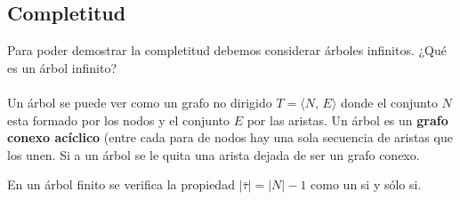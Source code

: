 \subsection{Completitud}
Para poder demostrar la completitud debemos considerar árboles infinitos. ¿Qué es un árbol infinito?
\paragraph{}
\begin{definition}
Un árbol se puede ver como un grafo no dirigido $T=\langle N, \, E \rangle$ donde el conjunto $N$ esta formado por los nodos y el conjunto $E$ por las aristas. Un árbol es un \textbf{grafo conexo  acíclico} (entre cada para de nodos hay una sola secuencia de aristas que los unen. Si a un árbol se le quita una arista dejada de ser un grafo conexo. 
\end{definition}
En un árbol finito se verifica la propiedad $\vert \bar{\tau} \vert = \vert N \vert -1 $ como un si y sólo si. 

